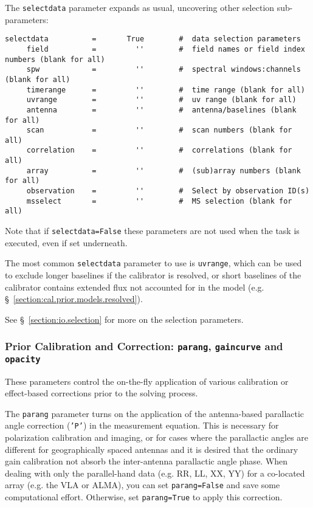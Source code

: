 The {\tt selectdata} parameter expands as usual, uncovering other
selection sub-parameters:
\small
\begin{verbatim}
selectdata          =       True        #  data selection parameters
     field          =         ''        #  field names or field index numbers (blank for all)
     spw            =         ''        #  spectral windows:channels (blank for all)
     timerange      =         ''        #  time range (blank for all)
     uvrange        =         ''        #  uv range (blank for all)
     antenna        =         ''        #  antenna/baselines (blank for all)
     scan           =         ''        #  scan numbers (blank for all)
     correlation    =         ''        #  correlations (blank for all)
     array          =         ''        #  (sub)array numbers (blank for all)
     observation    =         ''        #  Select by observation ID(s)
     msselect       =         ''        #  MS selection (blank for all)
\end{verbatim}
\normalsize
Note that if {\tt selectdata=False} these parameters are not used when
the task is executed, even if set underneath.

The most common {\tt selectdata} parameter to use is {\tt uvrange},
which can be used to exclude longer baselines if the calibrator is
resolved, or short baselines of the calibrator contains extended flux
not accounted for in the model 
(e.g. \S~\ref{section:cal.prior.models.resolved}).

See \S~\ref{section:io.selection} for more on the selection parameters.

\subsubsection{Prior Calibration and Correction: {\tt parang}, {\tt gaincurve} and
   {\tt opacity} }
\label{section:cal.solve.pars.prior}

These parameters control the on-the-fly application of various
calibration or effect-based corrections prior to the solving process.

The {\tt parang} parameter turns on the application of the
antenna-based parallactic angle correction ({\tt 'P'}) in the
measurement equation.  This is necessary for polarization calibration
and imaging, or for cases where the parallactic angles are different
for geographically spaced antennas and it is desired that the ordinary
gain calibration not absorb the inter-antenna parallactic angle phase.  
When dealing with only the parallel-hand data (e.g. RR, LL, XX, YY)
for a co-located array (e.g. the VLA or ALMA), you can set {\tt  parang=False} 
and save some computational effort.  Otherwise, set {\tt parang=True} to apply
this correction.

